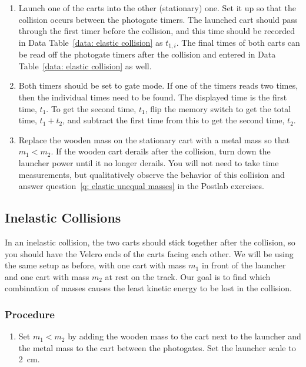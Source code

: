 \documentclass[addpoints]{physlabs}
\begin{document}
\begin{labsection}
\begin{experiment}
\begin{enumerate}
        \item Launch one of the carts into the other (stationary) one. Set it up so that the collision occurs between the photogate timers. The launched cart should pass through the first timer before the collision, and this time should be recorded in Data Table~\ref{data: elastic collision} as $t_{1,i}$. The final times of both carts can be read off the photogate timers after the collision and entered in Data Table~\ref{data: elastic collision} as well.

        \item Both timers should be set to gate mode. If one of the timers reads two times, then the individual times need to be found. The displayed time is the first time, $t_1$. To get the second time, $t_1$, flip the memory switch to get the total time, $t_1+t_2$, and subtract the first time from this to get the second time, $t_2$.

        \item Replace the wooden mass on the stationary cart with a metal mass so that $m_1<m_2$. If the wooden cart derails after the collision, turn down the launcher power until it no longer derails. You will not need to take time measurements, but qualitatively observe the behavior of this collision and answer question~\ref{q: elastic unequal masses} in the Postlab exercises.
    \end{enumerate}

    \subsection*{Inelastic Collisions}

    In an inelastic collision, the two carts should stick together after the collision, so you should have the Velcro ends of the carts facing each other. We will be using the same setup as before, with one cart with mass $m_1$ in front of the launcher and one cart with mass $m_2$ at rest on the track. Our goal is to find which combination of masses causes the least kinetic energy to be lost in the collision. 

    \subsubsection*{Procedure}

    \begin{enumerate}
        \item Set $m_1<m_2$ by adding the wooden mass to the cart next to the launcher and the metal mass to the cart between the photogates. Set the launcher scale to \qty{2}{\centi\meter}.


\end{enumerate}
\end{experiment}
\end{labsection}
\end{document}
